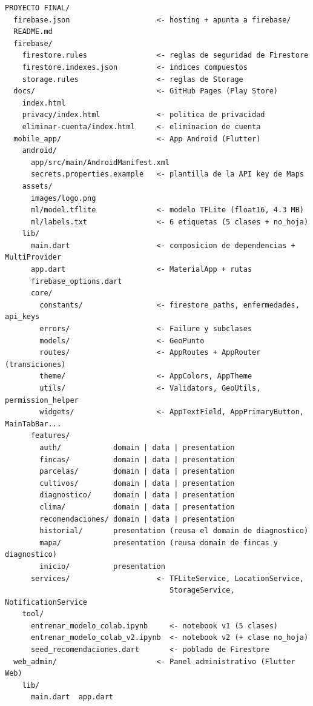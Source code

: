 \documentclass[12pt,a4paper]{article}
\begin{document}
{\small
\begin{verbatim}
PROYECTO FINAL/
  firebase.json                    <- hosting + apunta a firebase/
  README.md
  firebase/
    firestore.rules                <- reglas de seguridad de Firestore
    firestore.indexes.json         <- indices compuestos
    storage.rules                  <- reglas de Storage
  docs/                            <- GitHub Pages (Play Store)
    index.html
    privacy/index.html             <- politica de privacidad
    eliminar-cuenta/index.html     <- eliminacion de cuenta
  mobile_app/                      <- App Android (Flutter)
    android/
      app/src/main/AndroidManifest.xml
      secrets.properties.example   <- plantilla de la API key de Maps
    assets/
      images/logo.png
      ml/model.tflite              <- modelo TFLite (float16, 4.3 MB)
      ml/labels.txt                <- 6 etiquetas (5 clases + no_hoja)
    lib/
      main.dart                    <- composicion de dependencias + MultiProvider
      app.dart                     <- MaterialApp + rutas
      firebase_options.dart
      core/
        constants/                 <- firestore_paths, enfermedades, api_keys
        errors/                    <- Failure y subclases
        models/                    <- GeoPunto
        routes/                    <- AppRoutes + AppRouter (transiciones)
        theme/                     <- AppColors, AppTheme
        utils/                     <- Validators, GeoUtils, permission_helper
        widgets/                   <- AppTextField, AppPrimaryButton, MainTabBar...
      features/
        auth/            domain | data | presentation
        fincas/          domain | data | presentation
        parcelas/        domain | data | presentation
        cultivos/        domain | data | presentation
        diagnostico/     domain | data | presentation
        clima/           domain | data | presentation
        recomendaciones/ domain | data | presentation
        historial/       presentation (reusa el domain de diagnostico)
        mapa/            presentation (reusa domain de fincas y diagnostico)
        inicio/          presentation
      services/                    <- TFLiteService, LocationService,
                                      StorageService, NotificationService
    tool/
      entrenar_modelo_colab.ipynb     <- notebook v1 (5 clases)
      entrenar_modelo_colab_v2.ipynb  <- notebook v2 (+ clase no_hoja)
      seed_recomendaciones.dart       <- poblado de Firestore
  web_admin/                       <- Panel administrativo (Flutter Web)
    lib/
      main.dart  app.dart

\end{verbatim}}
\end{document}
